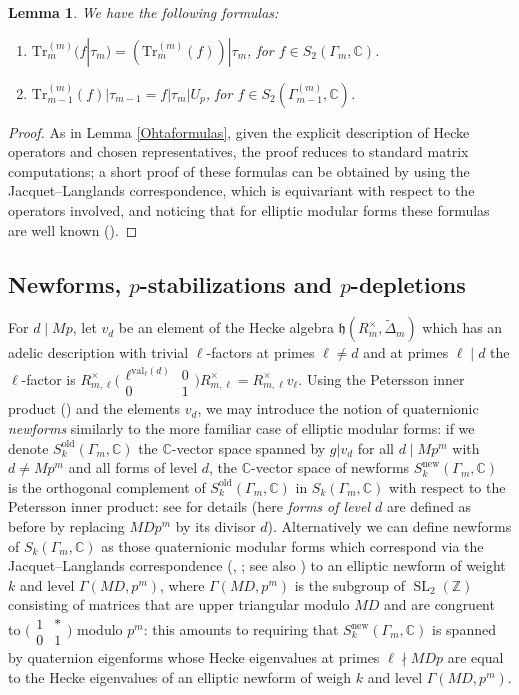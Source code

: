 \documentclass[a4paper,11pt]{amsart}
\numberwithin{equation}{section}
\theoremstyle{plain}
\newtheorem{lemma}[theorem]{Lemma}
\theoremstyle{definition}
\theoremstyle{remark}
\newcommand{\Z}{\mathbb{Z}}
\newcommand{\C}{\mathbb{C}}
\DeclareMathOperator{\SL}{SL}
\newcommand{\val}{\mathrm{val}}
\newcommand{\smallmat}[4]{\bigl(\begin{smallmatrix}#1&#2\\#3&#4\end{smallmatrix}\bigr)}
\begin{document}
\begin{lemma}\label{lemmatrace}
We have the following formulas:
\begin{enumerate}
\item $\mathrm{Tr}_m^{(m)}(f|\tau_m)=(\mathrm{Tr}_m^{(m)}(f))|\tau_m$,  
for $f\in S_2(\Gamma_m,\C)$. 
\item $\mathrm{Tr}_{m-1}^{(m)}(f)|\tau_{m-1}=f|\tau_{m}|U_p$, 
for $f\in S_2(\Gamma^{(m)}_{m-1},\C)$. 
\end{enumerate}
\end{lemma}
\begin{proof}
As in Lemma \ref{Ohtaformulas}, given the explicit description of Hecke operators and chosen representatives, the proof reduces to standard matrix computations; a short proof of these formulas can be obtained by using the Jacquet--Langlands correspondence, which is equivariant with respect to the operators involved, and noticing that for elliptic modular forms these formulas are well known (\cite[(2.3.3)]{Ohta-ES}).
\end{proof}

\subsection{Newforms, $p$-stabilizations and $p$-depletions} \label{stabilization}
For $d\mid Mp$, let $v_d$ be an element of the Hecke algebra $\mathfrak{h}(R_m^\times,\widetilde{\Delta}_m)$ which has an adelic description with trivial $\ell$-factors at primes $\ell\neq d$ and at primes $\ell\mid d$ the $\ell$-factor is $R_{m,\ell}^\times \smallmat {\ell^{\val_\ell(d)}}0{0}1R_{m,\ell}^\times=R_{m,\ell}^\times v_\ell$.  
Using the Petersson inner product (\cite[\S6.1]{Miyake}) and the elements $v_d$, we may introduce the notion of 
quaternionic \emph{newforms} similarly to the more familiar case of elliptic modular forms:
if we denote $S_k^\mathrm{old}(\Gamma_m,\C)$ the $\C$-vector space spanned by 
$g|v_d$ for all $d\mid Mp^m$ with $d\neq Mp^m$ and all forms of level $d$, 
the $\C$-vector space of newforms  $S_k^\mathrm{new}(\Gamma_m,\C)$
is the orthogonal complement of $S_k^\mathrm{old}(\Gamma_m,\C)$ in 
$S_k(\Gamma_m,\C)$ with respect to the Petersson inner product: 
see \cite[\S1.5]{Hijikata} for details (here \emph{forms of level $d$} 
are defined as before by replacing $MDp^m$ by its divisor $d$). 
Alternatively we can define newforms of $S_k(\Gamma_m,\C)$ as those quaternionic modular forms which correspond
via the Jacquet--Langlands correspondence (\cite[Proposition 2.12]{Hida-Abelian}, \cite[\S2.2]{LRdVP}; see also \cite[\S1.6]{BD}) to an elliptic newform of weight $k$ 
and level $\Gamma(MD,p^m)$, where $\Gamma(MD,p^m)$ is the 
subgroup of $\SL_2(\Z)$ consisting of matrices that are upper triangular modulo $MD$ 
and are congruent to $\smallmat 1*01$ modulo $p^m$: this amounts to requiring that 
$S_k^\mathrm{new}(\Gamma_m,\C)$ is spanned by quaternion eigenforms whose Hecke eigenvalues at primes $\ell\nmid MDp$ are equal to the Hecke eigenvalues of an elliptic newform of weigh $k$ 
and level $\Gamma(MD,p^m)$.  
\end{document}
